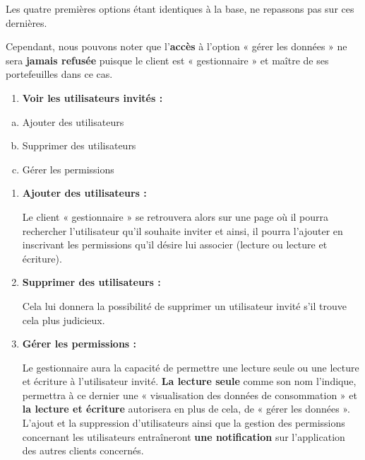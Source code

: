 \begin{flushleft}
Les quatre premières options étant identiques à la base, ne repassons pas sur ces dernières.
\end{flushleft}

\begin{flushleft}
Cependant, nous pouvons noter que l’\textbf{accès} à l’option « gérer les données » ne sera \textbf{jamais refusée} puisque le client est « gestionnaire » et maître de ses portefeuilles dans ce cas.
\end{flushleft}

\begin{enumerate}[-]
\item \textbf{Voir les utilisateurs invités : }
\end{enumerate}

\begin{enumerate}[a)]
\item Ajouter des utilisateurs
\item Supprimer des utilisateurs
\item Gérer les permissions
\end{enumerate}

\begin{enumerate}[-]

\item \textbf{Ajouter des utilisateurs :}

Le client « gestionnaire » se retrouvera alors sur une page où il pourra rechercher l’utilisateur qu’il souhaite inviter et ainsi, il pourra l’ajouter en inscrivant les permissions qu’il désire lui associer (lecture ou lecture et écriture).

\item \textbf{Supprimer des utilisateurs :}

Cela lui donnera la possibilité de supprimer un utilisateur invité s’il trouve cela plus judicieux.

\item \textbf{Gérer les permissions :}

Le gestionnaire aura la capacité de permettre une lecture seule ou une lecture et écriture à l’utilisateur invité.
\newline
\textbf{La lecture seule} comme son nom l’indique, permettra à ce dernier une « visualisation des données de consommation » et \textbf{la lecture et écriture} autorisera en plus de cela, de « gérer les données ».
\newline
L’ajout et la suppression d'utilisateurs ainsi que la gestion des permissions concernant les utilisateurs entraîneront \textbf{une notification} sur l’application des autres clients concernés.

\end{enumerate}

